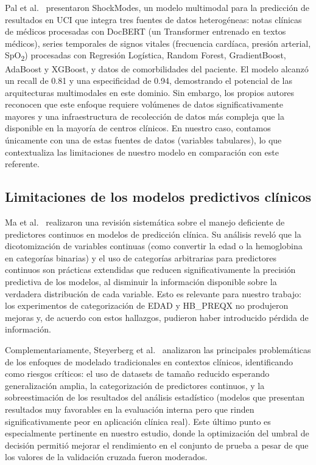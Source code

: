 \documentclass[12pt, letterpaper]{article}
\begin{document}
Pal et al.\ \cite{pal2022} presentaron ShockModes, un modelo multimodal para la predicción de resultados en UCI que integra tres fuentes de datos heterogéneas: notas clínicas de médicos procesadas con DocBERT (un Transformer entrenado en textos médicos), series temporales de signos vitales (frecuencia cardíaca, presión arterial, SpO\textsubscript{2}) procesadas con Regresión Logística, Random Forest, GradientBoost, AdaBoost y XGBoost, y datos de comorbilidades del paciente. El modelo alcanzó un recall de 0.81 y una especificidad de 0.94, demostrando el potencial de las arquitecturas multimodales en este dominio. Sin embargo, los propios autores reconocen que este enfoque requiere volúmenes de datos significativamente mayores y una infraestructura de recolección de datos más compleja que la disponible en la mayoría de centros clínicos. En nuestro caso, contamos únicamente con una de estas fuentes de datos (variables tabulares), lo que contextualiza las limitaciones de nuestro modelo en comparación con este referente.

\subsection{Limitaciones de los modelos predictivos clínicos}

Ma et al.\ \cite{ma2023} realizaron una revisión sistemática sobre el manejo deficiente de predictores continuos en modelos de predicción clínica. Su análisis reveló que la dicotomización de variables continuas (como convertir la edad o la hemoglobina en categorías binarias) y el uso de categorías arbitrarias para predictores continuos son prácticas extendidas que reducen significativamente la precisión predictiva de los modelos, al disminuir la información disponible sobre la verdadera distribución de cada variable. Esto es relevante para nuestro trabajo: los experimentos de categorización de EDAD y HB\_PREQX no produjeron mejoras y, de acuerdo con estos hallazgos, pudieron haber introducido pérdida de información.

Complementariamente, Steyerberg et al.\ \cite{steyerberg2018} analizaron las principales problemáticas de los enfoques de modelado tradicionales en contextos clínicos, identificando como riesgos críticos: el uso de datasets de tamaño reducido esperando generalización amplia, la categorización de predictores continuos, y la sobreestimación de los resultados del análisis estadístico (modelos que presentan resultados muy favorables en la evaluación interna pero que rinden significativamente peor en aplicación clínica real). Este último punto es especialmente pertinente en nuestro estudio, donde la optimización del umbral de decisión permitió mejorar el rendimiento en el conjunto de prueba a pesar de que los valores de la validación cruzada fueron moderados.
\end{document}
